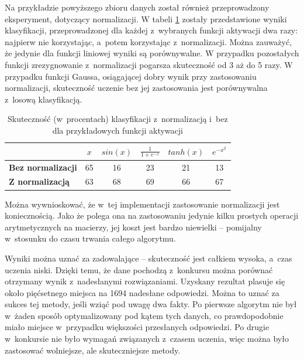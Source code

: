 \documentclass{article}
\begin{document}
Na przykładzie powyższego zbioru danych został również przeprowadzony eksperyment, dotyczący normalizacji.
W tabeli \ref{tab_norm} zostały przedstawione wyniki klasyfikacji, przeprowadzonej dla każdej z~wybranych funkcji aktywacji dwa razy: najpierw nie korzystając, a~potem korzystając z~normalizacji.
Można zauważyć, że jedynie dla funkcji liniowej wyniki są porównywalne.
W przypadku pozostałych funkcji zrezygnowanie z~normalizacji pogarsza skuteczność od 3 aż do 5 razy.
W przypadku funkcji Gaussa, osiągającej dobry wynik przy zastosowaniu normalizacji, skuteczność uczenie bez jej zastosowania jest porównywalna z~losową klasyfikacją.
\begin{table}[H]
\caption{Skuteczność (w~procentach) klasyfikacji z~normalizacją i~bez dla przykładowych funkcji aktywacji}
\label{tab_norm}
\begin{tabular}{|l|c|c|c|c|c|}
\hline
& $x$ & $sin(x)$ & $\frac{1}{1+e^{-x}}$ & $tanh(x)$ & $e^{-x^2}$ \\
\hline
\textbf{Bez normalizacji} & 65 & 16 & 23 & 21 & 13 \\
\hline
\textbf{Z normalizacją} & 63 & 68 & 69 & 66 & 67 \\
\hline

\hline
\end{tabular}
\end{table}
Można wywnioskować, że w~tej implementacji zastosowanie normalizacji jest koniecznością.
Jako że polega ona na zastosowaniu jedynie kilku prostych operacji arytmetycznych na macierzy, jej koszt jest bardzo niewielki -- pomijalny w~stosunku do czasu trwania całego algorytmu.

Wyniki można uznać za zadowalające -- skuteczność jest całkiem wysoka, a~czas uczenia niski.
Dzięki temu, że dane pochodzą z~konkursu można porównać otrzymany wynik z~nadesłanymi rozwiązaniami.
Uzyskany rezultat plasuje się około pięćsetnego miejsca na 1694 nadesłane odpowiedzi.
Można to uznać za sukces tej metody, jeśli wziąć pod uwagę dwa fakty.
Po pierwsze algorytm nie był w~żaden sposób optymalizowany pod kątem tych danych, co prawdopodobnie miało miejsce w~przypadku większości przesłanych odpowiedzi.
Po drugie w~konkursie nie było wymagań związanych z~czasem uczenia, więc można było zastosować wolniejsze, ale skuteczniejsze metody.
\end{document}
